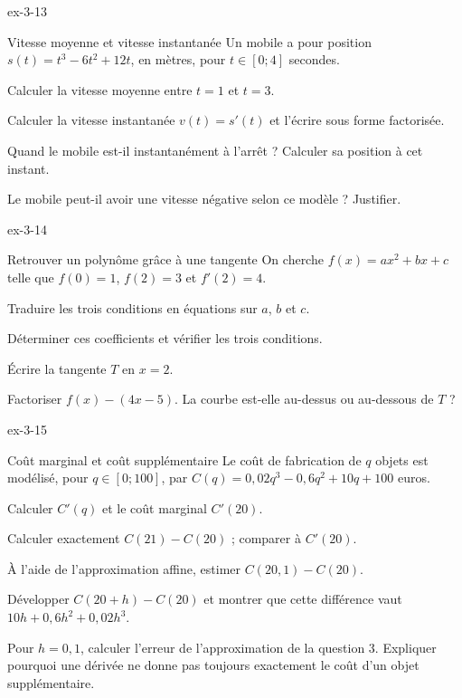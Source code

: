 \begin{blocLivre}{ex-3-13}
\begin{exercice}[3]{Vitesse moyenne et vitesse instantanée}
Un mobile a pour position $s(t)=t^3-6t^2+12t$, en mètres, pour $t\in[0;4]$ secondes.
\begin{questions}
\item Calculer la vitesse moyenne entre $t=1$ et $t=3$.
\item Calculer la vitesse instantanée $v(t)=s'(t)$ et l'écrire sous forme factorisée.
\item Quand le mobile est-il instantanément à l'arrêt ? Calculer sa position à cet instant.
\item Le mobile peut-il avoir une vitesse négative selon ce modèle ? Justifier.
\end{questions}
\end{exercice}
\end{blocLivre}
\begin{blocLivre}{ex-3-14}
\begin{exercice}[3]{Retrouver un polynôme grâce à une tangente}
On cherche $f(x)=ax^2+bx+c$ telle que $f(0)=1$, $f(2)=3$ et $f'(2)=4$.
\begin{questions}
\item Traduire les trois conditions en équations sur $a$, $b$ et $c$.
\item Déterminer ces coefficients et vérifier les trois conditions.
\item Écrire la tangente $T$ en $x=2$.
\item Factoriser $f(x)-(4x-5)$. La courbe est-elle au-dessus ou au-dessous de $T$ ?
\end{questions}
\end{exercice}
\end{blocLivre}
\begin{blocLivre}{ex-3-15}
\begin{exercice}[3]{Coût marginal et coût supplémentaire}
Le coût de fabrication de $q$ objets est modélisé, pour $q\in[0;100]$, par
$C(q)=0{,}02q^3-0{,}6q^2+10q+100$ euros.
\begin{questions}\item Calculer $C'(q)$ et le coût marginal $C'(20)$.
\item Calculer exactement $C(21)-C(20)$ ; comparer à $C'(20)$.
\item À l'aide de l'approximation affine, estimer $C(20{,}1)-C(20)$.
\end{questions}
\begin{questions}[resume]
\item Développer $C(20+h)-C(20)$ et montrer que cette différence vaut
$10h+0{,}6h^2+0{,}02h^3$.
\item Pour $h=0{,}1$, calculer l'erreur de l'approximation de la question 3.
Expliquer pourquoi une dérivée ne donne pas toujours exactement le coût d'un objet supplémentaire.
\end{questions}
\end{exercice}
\end{blocLivre}
